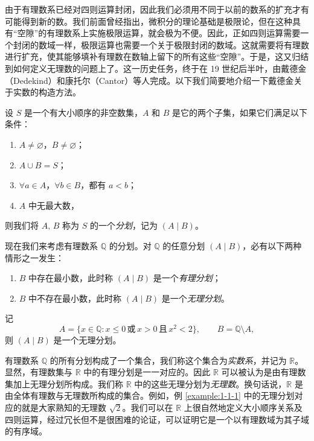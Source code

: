 \documentclass[UTF8,12pt,a4paper,fontset=fandol]{ctexbook}
\begin{document}
由于有理数系已经对四则运算封闭，因此我们必须用不同于以前的数系的扩充才有可能得到新的数。我们前面曾经指出，微积分的理论基础是极限论，但在这种具有“空隙”的有理数系上实施极限运算，就会极为不便。因此，正如四则运算需要一个封闭的数域一样，极限运算也需要一个关于极限封闭的数域。这就需要将有理数进行扩充，使其能够填补有理数在数轴上留下的所有这些“空隙”。于是，这又归结到如何定义无理数的问题上了。这一历史任务，终于在 19 世纪后半叶，由戴德金（Dedekind）和康托尔（Cantor）等人完成。以下我们简要地介绍一下戴德金关于实数的构造方法。


\begin{definition}
设 $S$ 是一个有大小顺序的非空数集，$A$ 和 $B$ 是它的两个子集，如果它们满足以下条件：
\begin{enumerate}[label=(\arabic*)]
  \item $A\ne\varnothing$，$B\ne\varnothing$；
  \item $A\cup B=S$；
  \item $\forall a\in A$，$\forall b\in B$，都有 $a<b$；
  \item $A$ 中无最大数，
\end{enumerate}
则我们将 $A,\,B$ 称为 $S$ 的一个\emph{分划}，记为 $(A\mid B)$。
\end{definition}


现在我们来考虑有理数系 $\mathbb{Q}$ 的分划。对 $\mathbb{Q}$ 的任意分划 $(A\mid B)$，必有以下两种情形之一发生：
\begin{enumerate}[label=(\arabic*)]
  \item $B$ 中存在最小数，此时称 $(A\mid B)$ 是一个\emph{有理分划}；
  \item $B$ 中不存在最小数，此时称 $(A\mid B)$ 是一个\emph{无理分划}。
\end{enumerate}


\begin{example}\label{example:1-1-1}
记
\[
  A=\{x\in\mathbb{Q}:x\leqslant 0\,\text{或}\, x>0\,\text{且}\,x^2<2\},\qquad B=\mathbb{Q}\setminus A,
\]
则 $(A\mid B)$ 是一个无理分划。
\end{example}


有理数系 $\mathbb{Q}$ 的所有分划构成了一个集合，我们称这个集合为\emph{实数系}，并记为 $\mathbb{R}$。显然，有理数集与 $\mathbb{R}$ 中的有理分划是一一对应的。因此 $\mathbb{R}$ 可以被认为是由有理数集加上无理分划所构成。我们称 $\mathbb{R}$ 中的这些无理分划为\emph{无理数}。换句话说，$\mathbb{R}$ 是由全体有理数与无理数所构成的集合。例如，例 \ref{example:1-1-1} 中的无理分划对应的就是大家熟知的无理数 $\sqrt{2}$。我们可以在 $\mathbb{R}$ 上很自然地定义大小顺序关系及四则运算，经过冗长但不是很困难的论证，可以证明它是一个以有理数域为其子域的有序域。
\end{document}
